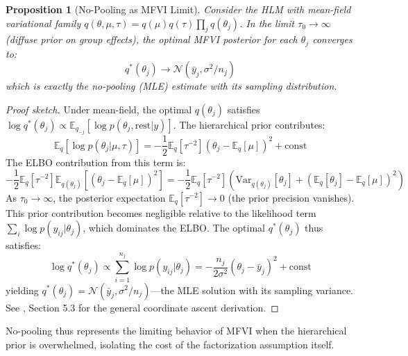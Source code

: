 \documentclass[10pt]{article} %
\theoremstyle{plain}
\newtheorem{proposition}[theorem]{Proposition}
\theoremstyle{definition}
\newcommand{\E}{\mathbb{E}}
\begin{document}
\begin{proposition}[No-Pooling as MFVI Limit]
\label{prop:no-pooling}
Consider the HLM with mean-field variational family $q(\theta, \mu, \tau) = q(\mu)q(\tau)\prod_j q(\theta_j)$. In the limit $\tau_0 \to \infty$ (diffuse prior on group effects), the optimal MFVI posterior for each $\theta_j$ converges to:
\begin{equation}
q^*(\theta_j) \to \mathcal{N}(\bar{y}_j, \sigma^2/n_j)
\end{equation}
which is exactly the no-pooling (MLE) estimate with its sampling distribution.
\end{proposition}
\begin{proof}[Proof sketch]
Under mean-field, the optimal $q(\theta_j)$ satisfies $\log q^*(\theta_j) \propto \E_{q_{-j}}[\log p(\theta_j, \text{rest} | y)]$. The hierarchical prior contributes:
\begin{equation}
\E_q[\log p(\theta_j | \mu, \tau)] = -\frac{1}{2}\E_q[\tau^{-2}](\theta_j - \E_q[\mu])^2 + \text{const}
\end{equation}
The ELBO contribution from this term is:
\begin{equation}
-\frac{1}{2}\E_q[\tau^{-2}]\E_{q(\theta_j)}[(\theta_j - \E_q[\mu])^2] = -\frac{1}{2}\E_q[\tau^{-2}]\left(\text{Var}_{q(\theta_j)}[\theta_j] + (\E_q[\theta_j] - \E_q[\mu])^2\right)
\end{equation}
As $\tau_0 \to \infty$, the posterior expectation $\E_q[\tau^{-2}] \to 0$ (the prior precision vanishes). This prior contribution becomes negligible relative to the likelihood term $\sum_i \log p(y_{ij} | \theta_j)$, which dominates the ELBO. The optimal $q^*(\theta_j)$ thus satisfies:
\begin{equation}
\log q^*(\theta_j) \propto \sum_{i=1}^{n_j} \log p(y_{ij} | \theta_j) = -\frac{n_j}{2\sigma^2}(\theta_j - \bar{y}_j)^2 + \text{const}
\end{equation}
yielding $q^*(\theta_j) = \mathcal{N}(\bar{y}_j, \sigma^2/n_j)$---the MLE solution with its sampling variance. See \citet{blei2017variational}, Section 5.3 for the general coordinate ascent derivation.
\end{proof}

\noindent No-pooling thus represents the limiting behavior of MFVI when the hierarchical prior is overwhelmed, isolating the cost of the factorization assumption itself.
\end{document}
